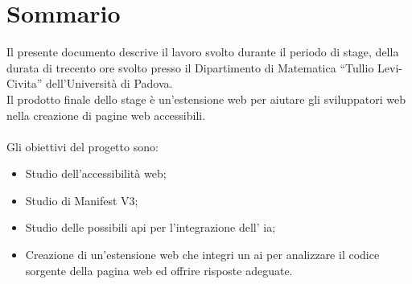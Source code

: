 \cleardoublepage
{}
{}
\begingroup
\let\clearpage\relax
\let\cleardoublepage\relax
\chapter*{Sommario}

\noindent Il presente documento descrive il lavoro svolto durante il periodo di stage, della durata di trecento ore svolto presso il Dipartimento di Matematica “Tullio Levi-Civita” dell’Università di Padova. \\
Il prodotto finale dello stage è un'estensione web  per aiutare gli sviluppatori web nella creazione di pagine web accessibili.\\
\\
Gli obiettivi del progetto sono:
\begin{itemize}
    \item Studio dell'accessibilità web;
    \item Studio di Manifest V3;
    \item Studio delle possibili \acrshort{api} per l'integrazione dell' \acrshort{ia};
    \item Creazione di un'estensione web che integri un  \acrshort{ai} per analizzare il codice sorgente della pagina web ed offrire risposte adeguate.
\end{itemize}

\endgroup
\vfill
